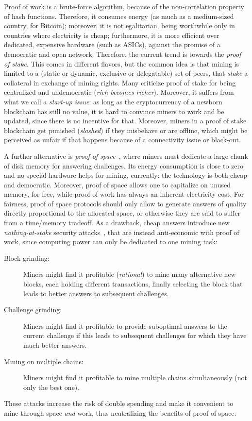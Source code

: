 Proof of work is a brute-force algorithm,
because of the non-correlation property of hash functions.
Therefore, it consumes energy (as much as a medium-sized country, for Bitcoin);
moreover, it is not egalitarian, being
worthwhile only in countries where electricity is cheap; furthermore, it
is more efficient over dedicated, expensive hardware (such as ASICs),
against the promise of a democratic and open network.
Therefore, the current trend is towards the \emph{proof of stake}.
This comes in different flavors, but
the common idea is that mining is limited to a (static or dynamic, exclusive or delegatable)
set of peers, that \emph{stake} a collateral in exchange of mining rights.
Many criticize proof of stake for being centralized and undemocratic
(\emph{rich becomes richer}).
Moreover, it suffers from what we call a \emph{start-up issue}: as long as the cryptocurrency
of a newborn blockchain has still no value, it is hard to convince miners to work and
be updated, since there is no incentive for that. Moreover, miners in
a proof of stake blockchain get punished (\emph{slashed}) if they misbehave or are offline, which
might be perceived as unfair if that happens because of a connectivity issue or black-out.

A further alternative is \emph{proof of space}~\cite{AtenieseBFG14,DziembowskiFKP15}, where
miners must dedicate a large chunk of disk memory for answering challenges.
Its energy consumption is close to zero and no special
hardware helps for mining, currently: the technology is both cheap
and democratic. Moreover, proof of space allows
one to capitalize on unused memory, for free, while proof of work has always an
inherent electricity cost.
For fairness, proof of space protocols should only allow to generate answers of
quality directly proportional to the allocated space, or otherwise they are said
to suffer from a time/memory tradeoff. As a drawback,
cheap answers introduce new \emph{nothing-at-stake} security attacks~\cite{ParkKFGAP18}, that are instead anti-economic with proof of work,
since computing power can only be dedicated to one mining task:
%
\begin{description}
\item[Block grinding:] Miners might find it profitable (\emph{rational})
  to mine many alternative new blocks, each holding
  different transactions, finally selecting the block that leads to better answers
  to subsequent challenges.
\item[Challenge grinding:] Miners might find it profitable
  to provide suboptimal answers to the current challenge if
  this leads to subsequent challenges for which they have much better answers.
\item[Mining on multiple chains:] Miners might find it profitable
  to mine multiple chains simultaneously (not only the best one).
\end{description}
%
These attacks increase the risk of double spending and make it convenient
to mine through space \emph{and} work, thus neutralizing the benefits of proof of space.

